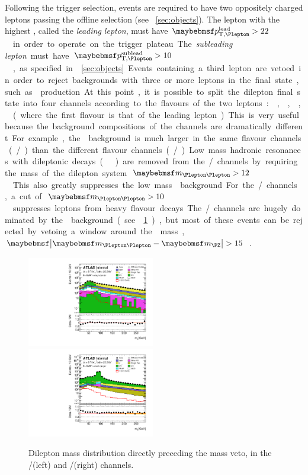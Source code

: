 Following the trigger selection, events are required to have two oppositely charged 
leptons passing the offline selection (see \Section~\ref{sec:objects}). The lepton with 
the highest \pt, called the \textit{leading lepton}, must have 
\unit{$\ptleadlep > 22$}{\GeV} in order to operate on the trigger plateau. The 
\textit{subleading lepton} must have \unit{$\ptsubleadlep > 10$}{\GeV}, as specified in 
\Section~\ref{sec:objects}. Events containing a third lepton are vetoed in order to 
reject backgrounds with three or more leptons in the final state, such as \WZ production.

At this point, it is possible to split the dilepton final state into four channels 
according to the flavours of the two leptons: \eech, \mmch, \emch, \mech (where the first 
flavour is that of the leading lepton). This is very useful because the background 
compositions of the channels are dramatically different. For example, the \DY background 
is much larger in the same flavour channels (\eech/\mmch) than the different flavour 
channels (\emch/\mech).

Low mass hadronic resonances with dileptonic decays (\eg \PJpsi) are removed from the 
\eech/\mmch channels by requiring the mass of the dilepton system 
\unit{$\mll > 12$}{\GeV}. 
This also greatly suppresses the low mass \DY background. For the \emch/\mech channels, 
a cut of \unit{$\mll > 10$}{\GeV} suppresses leptons from heavy flavour decays. The 
\eech/\mmch channels are hugely dominated by the \DY background (see 
\Figure~\ref{fig:sel:mll}), but most of these events can be rejected by 
vetoing a window around the \PZ mass, \unit{$\mods{\mll - \mZ} > 15$}{\GeV}.

\begin{figure}
	\includegraphics[width=0.495\textwidth]{tex/selection/emme_CutMll_Mll_mh125_log}
	\hfill
	\includegraphics[width=0.495\textwidth]{tex/selection/eemm_CutMll_Mll_mh125_log}
	\caption{Dilepton mass distribution directly preceding the \PZ mass veto, in the 
	\emch/\mech (left) and \eech/\mmch (right) channels.}
	\label{fig:sel:mll}
\end{figure}

